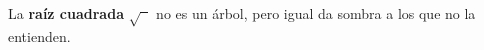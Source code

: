 \begin{capitulobox}
La \textbf{raíz cuadrada} $\sqrt{\phantom{x}}$ no es un árbol, pero igual da sombra a los que no la entienden.
\end{capitulobox}